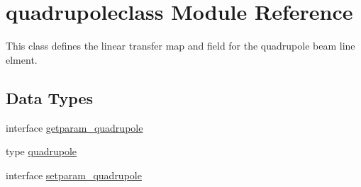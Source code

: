 \hypertarget{namespacequadrupoleclass}{}\section{quadrupoleclass Module Reference}
\label{namespacequadrupoleclass}


This class defines the linear transfer map and field for the quadrupole beam line elment.  


\subsection*{Data Types}
\begin{DoxyCompactItemize}
\item 
interface \mbox{\hyperlink{interfacequadrupoleclass_1_1getparam__quadrupole}{getparam\+\_\+quadrupole}}
\item 
type \mbox{\hyperlink{namespacequadrupoleclass_structquadrupoleclass_1_1quadrupole}{quadrupole}}
\item 
interface \mbox{\hyperlink{interfacequadrupoleclass_1_1setparam__quadrupole}{setparam\+\_\+quadrupole}}
\end{DoxyCompactItemize}
